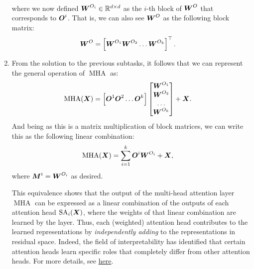 \documentclass[11pt,a4paper]{article}
\newcommand\op[1]{\operatorname{#1}}
\begin{document}
\begin{enumerate}[label=(\alph*)]
\begin{align}
          \end{align}
          where we now defined ${\boldsymbol{W}}^{O_i}\in\mathbb{R}^{d\times d}$ as the $i$-th
          block of ${\boldsymbol{W}}^O$ that corresponds to ${\boldsymbol{O}}^i$.
          That is, we can also see ${\boldsymbol{W}}^O$ as the following block matrix:
          \begin{align}
              {\boldsymbol{W}}^O & = \left[{\boldsymbol{W}}^{O_1} {\boldsymbol{W}}^{O_2} \ldots {\boldsymbol{W}}^{O_k}\right]^\top.
          \end{align}
    \item From the solution to the previous subtasks, it follows that we can
          represent the general operation of $\op{MHA}$ as:
          \begin{align}
              \op{MHA}(\mX) & = \left[\mO^1\mO^2\ldots\mO^k\right] \begin{bmatrix}
                                                                       \mW^{O_1} \\
                                                                       \mW^{O_2} \\
                                                                       \ldots    \\
                                                                       \mW^{O_k}
                                                                   \end{bmatrix}
              + \mX.
          \end{align}
          And being as this is a matrix multiplication of block matrices, we
          can write this as the following linear combination:
          \begin{align}
              \op{MHA}(\mX) & = \sum_{i=1}^{k} \mO^i\mW^{O_i} + \mX,
          \end{align}
          where ${\boldsymbol{M}}^i = {\boldsymbol{W}}^{O_i}$ as desired.

          This equivalence shows that the output of the multi-head attention
          layer $\op{MHA}$ can be expressed as a linear combination of the
          outputs of each attention head $\op{SA}_i(\mX)$, where the weights
          of that linear combination are learned by the layer.
          Thus, each (weighted) attention head contributes to the
          learned representations by \emph{independently adding} to the 
          representations in residual space. 
          Indeed, the field of interpretability has identified that certain 
          attention heads learn specific roles that completely differ from other
          attention heads.
          For more details, see \href{https://transformer-circuits.pub/2021/framework/index.html}{here}.
\end{enumerate}
\end{document}
